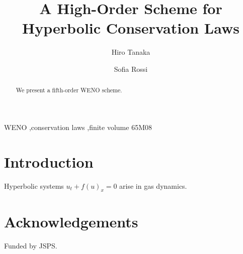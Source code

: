 \documentclass[preprint,12pt]{elsarticle}
\begin{document}
\begin{frontmatter}
\title{A High-Order Scheme for Hyperbolic Conservation Laws}

\author[inst1]{Hiro Tanaka}
\author[inst2]{Sofia Rossi}
\address[inst2]{Politecnico di Esempio, Milan, Italy}

\begin{abstract}
We present a fifth-order WENO scheme.
\end{abstract}

\begin{keyword}
WENO \sep conservation laws \sep finite volume
\MSC[2010] 65M08
\end{keyword}
\end{frontmatter}

\linenumbers
\section{Introduction}
\label{sec:intro}
Hyperbolic systems $u_t + f(u)_x = 0$ arise in gas dynamics.

\section*{Acknowledgements}
Funded by JSPS.
\end{document}

